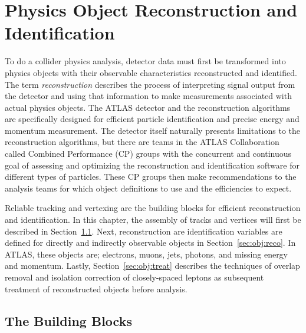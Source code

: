 \chapter{Physics Object Reconstruction and Identification}
\label{ch:obj}
To do a collider physics analysis, detector data must first be transformed into physics objects with their observable characteristics reconstructed and identified.  The term \textit{reconstruction} describes the process of interpreting signal output from the detector and using that information to make measurements associated with actual physics objects.  The ATLAS detector and the reconstruction algorithms are specifically designed for efficient particle identification and precise energy and momentum measurement.  The detector itself naturally presents limitations to the reconstruction algorithms, but there are teams in the ATLAS Collaboration called Combined Performance (CP) groups with the concurrent and continuous goal of assessing and optimizing the reconstruction and identification software for different types of particles.  These CP groups then make recommendations to the analysis teams for which object definitions to use and the efficiencies to expect.

Reliable tracking and vertexing are the building blocks for efficient reconstruction and identification.  In this chapter, the assembly of tracks and vertices will first be described in Section~\ref{sec:obj:bb}.    Next, reconstruction are identification variables are defined for directly and indirectly observable objects in Section~\ref{sec:obj:reco}.  In ATLAS, these objects are; electrons, muons, jets, photons, and missing energy and momentum.  Lastly, Section~\ref{sec:obj:treat} describes the techniques of overlap removal and isolation correction of closely-spaced leptons as subsequent treatment of reconstructed objects before analysis.  

\section{The Building Blocks}
\label{sec:obj:bb}

